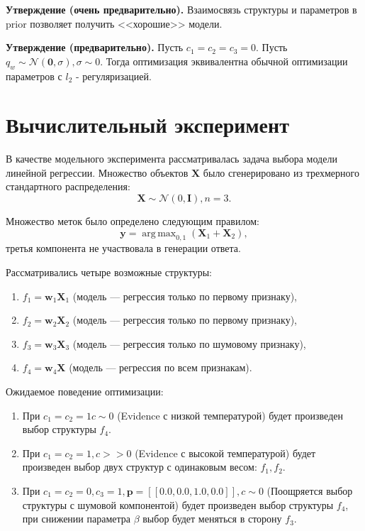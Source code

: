 \documentclass[12pt]{article}
\DeclareMathOperator*{\argmax}{arg\,max}
\begin{document}
\textbf{Утверждение (очень предварительно).} Взаимосвязь структуры и параметров в prior позволяет получить <<хорошие>> модели.

\textbf{Утверждение (предварительно).} Пусть $c_1 = c_2 = c_3 = 0$. Пусть $q_w \sim \mathcal{N}(\mathbf{0}, \sigma), \sigma \sim 0$. 
Тогда оптимизация эквивалентна обычной оптимизации параметров с $l_2$ - регуляризацией.


\section{Вычислительный эксперимент}
В качестве модельного эксперимента рассматривалась задача выбора модели линейной регрессии.
Множество объектов $\mathbf{X}$ было сгенерировано из трехмерного стандартного распределения: 
\[
    \mathbf{X} \sim \mathcal{N}(0, \mathbf{I}), n = 3.
\]

Множество меток было определено следующим правилом:
\[
    \mathbf{y}= \argmax_{0,1} (\mathbf{X}_1 + \mathbf{X}_2),
\]
третья компонента не участвовала в генерации ответа.

Рассматривались четыре возможные структуры:
\begin{enumerate}
\item $f_1 = \mathbf{w}_1 \mathbf{X}_1$ (модель --- регрессия только по первому признаку), 

\item $f_2 = \mathbf{w}_2 \mathbf{X}_2$ (модель --- регрессия только по первому признаку), 

\item $f_3 = \mathbf{w}_3 \mathbf{X}_3$ (модель --- регрессия только по шумовому признаку), 

\item $f_4 = \mathbf{w}_4 \mathbf{X}$ (модель --- регрессия по всем признакам). 
\end{enumerate}

Ожидаемое поведение оптимизации:
\begin{enumerate}
\item При $c_1 = c_2 = 1 c \sim 0$ (Evidence с низкой температурой) будет произведен выбор структуры $f_4$.

\item При $c_1 = c_2 = 1, c >>0$ (Evidence с высокой температурой) будет произведен выбор двух структур с одинаковым весом: $f_1, f_2$.

\item При $c_1 = c_2 = 0, c_3 = 1, \mathbf{p}= [[0.0, 0.0, 1.0, 0.0]], c \sim 0$ (Поощряется выбор структуры с шумовой компонентой) будет произведен выбор структуры $f_4$, при снижении параметра $\beta$ выбор будет меняться в сторону $f_3$.
\end{enumerate}
\end{document}
